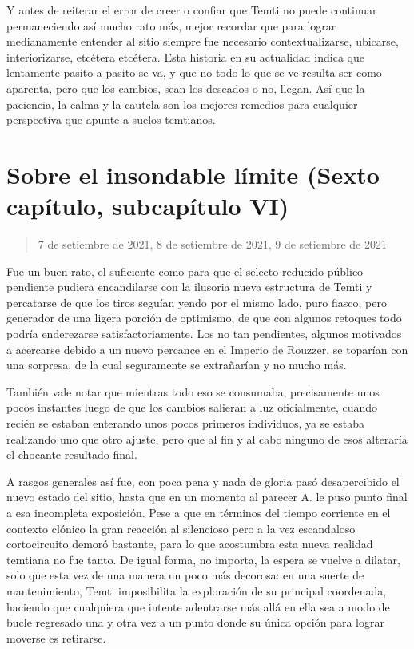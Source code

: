 \documentclass[
  spanish,
]{book}
\begin{document}
Y antes de reiterar el error de creer o confiar que Temti no puede continuar permaneciendo así mucho rato más, mejor recordar que para lograr medianamente entender al sitio siempre fue necesario contextualizarse, ubicarse, interiorizarse, etcétera etcétera. Esta historia en su actualidad indica que lentamente pasito a pasito se va, y que no todo lo que se ve resulta ser como aparenta, pero que los cambios, sean los deseados o no, llegan. Así que la paciencia, la calma y la cautela son los mejores remedios para cualquier perspectiva que apunte a suelos temtianos.

\hypertarget{sobre-el-insondable-luxedmite-sexto-capuxedtulo-subcapuxedtulo-vi}{%
\section{Sobre el insondable límite (Sexto capítulo, subcapítulo VI)}\label{sobre-el-insondable-luxedmite-sexto-capuxedtulo-subcapuxedtulo-vi}}

\begin{quote}
7 de setiembre de 2021, 8 de setiembre de 2021, 9 de setiembre de 2021
\end{quote}

Fue un buen rato, el suficiente como para que el selecto reducido público pendiente pudiera encandilarse con la ilusoria nueva estructura de Temti y percatarse de que los tiros seguían yendo por el mismo lado, puro fiasco, pero generador de una ligera porción de optimismo, de que con algunos retoques todo podría enderezarse satisfactoriamente. Los no tan pendientes, algunos motivados a acercarse debido a un nuevo percance en el Imperio de Rouzzer, se toparían con una sorpresa, de la cual seguramente se extrañarían y no mucho más.

También vale notar que mientras todo eso se consumaba, precisamente unos pocos instantes luego de que los cambios salieran a luz oficialmente, cuando recién se estaban enterando unos pocos primeros individuos, ya se estaba realizando uno que otro ajuste, pero que al fin y al cabo ninguno de esos alteraría el chocante resultado final.

A rasgos generales así fue, con poca pena y nada de gloria pasó desapercibido el nuevo estado del sitio, hasta que en un momento al parecer A. le puso punto final a esa incompleta exposición. Pese a que en términos del tiempo corriente en el contexto clónico la gran reacción al silencioso pero a la vez escandaloso cortocircuito demoró bastante, para lo que acostumbra esta nueva realidad temtiana no fue tanto. De igual forma, no importa, la espera se vuelve a dilatar, solo que esta vez de una manera un poco más decorosa: en una suerte de mantenimiento, Temti imposibilita la exploración de su principal coordenada, haciendo que cualquiera que intente adentrarse más allá en ella sea a modo de bucle regresado una y otra vez a un punto donde su única opción para lograr moverse es retirarse.
\end{document}
